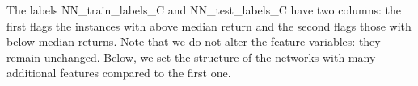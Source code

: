 \documentclass[]{krantz}
\makeatletter
\newenvironment{Shaded}{\begin{snugshade}}{\end{snugshade}}
\newcommand{\CommentTok}[1]{\textcolor[rgb]{0.37,0.37,0.37}{\textit{#1}}}
\newcommand{\KeywordTok}[1]{\textcolor[rgb]{0.27,0.27,0.27}{\textbf{#1}}}
\newcommand{\NormalTok}[1]{#1}
\newcommand{\OperatorTok}[1]{\textcolor[rgb]{0.43,0.43,0.43}{\textbf{#1}}}
\newcommand{\StringTok}[1]{\textcolor[rgb]{0.5,0.5,0.5}{#1}}
\newenvironment{kframe}{%
\medskip{}
\setlength{\fboxsep}{.8em}
 \def\at@end@of@kframe{}%
 \ifinner\ifhmode%
  \def\at@end@of@kframe{\end{minipage}}%
  \begin{minipage}{\columnwidth}%
 \fi\fi%
 \def\FrameCommand##1{\hskip\@totalleftmargin \hskip-\fboxsep
 \colorbox{shadecolor}{##1}\hskip-\fboxsep
     \hskip-\linewidth \hskip-\@totalleftmargin \hskip\columnwidth}%
 \MakeFramed {\advance\hsize-\width
   \@totalleftmargin\z@ \linewidth\hsize
   \@setminipage}}%
 {\par\unskip\endMakeFramed%
 \at@end@of@kframe}
\renewenvironment{Shaded}{\begin{kframe}}{\end{kframe}}
\theoremstyle{definition}
\theoremstyle{definition}
\theoremstyle{definition}
\theoremstyle{remark}
\makeatother
\begin{document}
\footnotesize

\begin{Shaded}
\end{Shaded}

\normalsize

The labels NN\_train\_labels\_C and NN\_test\_labels\_C have two
columns: the first flags the instances with above median return and the
second flags those with below median returns. Note that we do not alter
the feature variables: they remain unchanged. Below, we set the
structure of the networks with many additional features compared to the
first one.

\footnotesize
\end{document}
